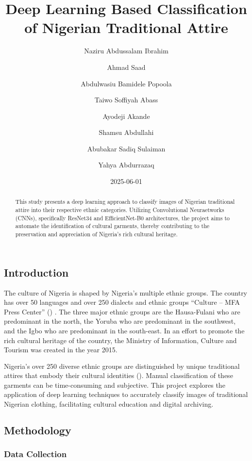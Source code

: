 \documentclass[
  letterpaper,
  DIV=11,
  numbers=noendperiod]{scrartcl}
\title{Deep Learning Based Classification of Nigerian Traditional
Attire}
\author{Naziru Abdussalam Ibrahim \and Ahmad Saad \and Abdulwasiu
Bamidele Popoola \and Taiwo Soffiyah Abass \and Ayodeji
Akande \and Shamsu Abdullahi \and Abubakar Sadiq Sulaiman \and Yahya
Abdurrazaq}
\date{2025-06-01}
\begin{document}
\maketitle
\begin{abstract}
This study presents a deep learning approach to classify images of
Nigerian traditional attire into their respective ethnic categories.
Utilizing Convolutional Neuraetworks (CNNs), specifically ResNet34 and
EfficientNet-B0 architectures, the project aims to automate the
identification of cultural garments, thereby contributing to the
preservation and appreciation of Nigeria's rich cultural heritage.
\end{abstract}


\subsection{Introduction}\label{introduction}

The culture of Nigeria is shaped by Nigeria's multiple ethnic groups.
The country has over 50 languages and over 250 dialects and ethnic
groups {``Culture -- {MFA} {Press} {Center}''}
() . The three major ethnic
groups are the Hausa-Fulani who are predominant in the north, the Yoruba
who are predominant in the southwest, and the Igbo who are predominant
in the south-east. In an effort to promote the rich cultural heritage of
the country, the Ministry of Information, Culture and Tourism was
created in the year 2015.

Nigeria's over 250 diverse ethnic groups are distinguished by unique
traditional attires that embody their cultural identities
(). Manual classification of these garments can be
time-consuming and subjective. This project explores the application of
deep learning techniques to accurately classify images of traditional
Nigerian clothing, facilitating cultural education and digital
archiving.

\subsection{Methodology}\label{methodology}

\subsubsection{Data Collection}\label{data-collection}
\end{document}
